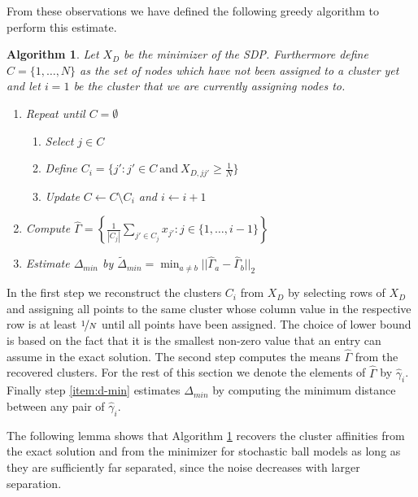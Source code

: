 \documentclass[10pt,a4paper]{article}
\newtheorem{algorithm}{Algorithm}
\begin{document}
From these observations we have defined the following greedy algorithm to perform this estimate.

\vspace{0.5em}
\begin{algorithm}
  \label{alg:d-min}
  Let $X_{D}$ be the minimizer of the SDP.
  Furthermore define $C = \{ 1, \dots, N \}$ as the set of nodes which have not been assigned to a cluster yet and let $i = 1$ be the cluster that we are currently assigning nodes to.
  \begin{enumerate}[label=(\roman*)]
  \item \label{item:clusters} Repeat until $C = \emptyset$
    \begin{enumerate}
    \item Select $j \in C$
    \item Define $C_{i} = \{ j' : j' \in C\ \text{and}\ X_{D,jj'} \ge \frac{1}{N} \}$
    \item Update $C \leftarrow C \setminus C_{i}$ and $i \leftarrow i + 1$
    \end{enumerate}
  \item \label{item:gamma-hat} Compute $\hat{\Gamma} = \left\{ \frac{1}{|C_{j}|} \sum_{j' \in C_{j}} x_{j'} : j \in \{ 1, \dots, i - 1 \} \right\}$
  \item \label{item:d-min} Estimate $\Delta_{min}$ by $\tilde{\Delta}_{min} = \min_{a \ne b} ||\hat{\Gamma}_{a} - \hat{\Gamma}_{b}||_{2}$
  \end{enumerate}
\end{algorithm}

In the first step we reconstruct the clusters $C_{i}$ from $X_{D}$ by selecting rows of $X_{D}$ and assigning all points to the same cluster whose column value in the respective row is at least $\nicefrac{1}{N}$ until all points have been assigned.
The choice of lower bound is based on the fact that it is the smallest non-zero value that an entry can assume in the exact solution.
The second step computes the means $\hat{\Gamma}$ from the recovered clusters.
For the rest of this section we denote the elements of $\hat{\Gamma}$ by $\hat{\gamma}_{i}$.
Finally step \ref{item:d-min} estimates $\Delta_{min}$ by computing the minimum distance between any pair of $\hat{\gamma}_{i}$.

The following lemma shows that Algorithm \ref{alg:d-min} recovers the cluster affinities from the exact solution and from the minimizer for stochastic ball models as long as they are sufficiently far separated, since the noise decreases with larger separation.
\end{document}

